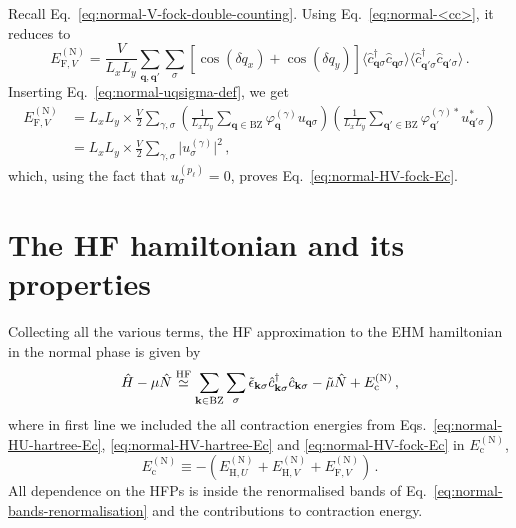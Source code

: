 \begin{tabproof}

	Recall Eq.~\eqref{eq:normal-V-fock-double-counting}. Using Eq.~\eqref{eq:normal-<cc>}, it reduces to
	\[
		E_{\mathrm{F},V}^{(\mathrm{N})} = \frac{V}{L_x L_y} \sum_{ \mathbf{q}, \mathbf{q}'} \sum_\sigma \left[
		\cos \left(
		\delta q_x
		\right)	+ \cos \left(
		\delta q_y
		\right)	
		\right]	
		\langle
		\hat c_{\mathbf{q} \sigma}^\dagger \hat c_{\mathbf{q} \sigma}
		\rangle \langle
		\hat c_{\mathbf{q}' \sigma}^\dagger  \hat c_{\mathbf{q}' \sigma}
		\rangle \, .
	\]
	Inserting Eq.~\eqref{eq:normal-uqsigma-def}, we get
	\[
	\begin{aligned}
		E_{\mathrm{F},V}^{(\mathrm{N})} &= L_x L_y \times \frac{V}{2} \sum_{\gamma,\sigma} \left(
		\frac{1}{L_x L_y} \sum_{\mathbf{q}\in\mathrm{BZ}} \varphi_\mathbf{q}^{(\gamma)} u_{\mathbf{q}\sigma}
		\right) \left(
		\frac{1}{L_x L_y} \sum_{\mathbf{q}'\in\mathrm{BZ}} \varphi_{\mathbf{q}'}^{(\gamma)*} u_{\mathbf{q}'\sigma}^*
		\right) \\
		&= L_x L_y \times \frac{V}{2} \sum_{\gamma,\sigma}
		\big|
			u_\sigma^{(\gamma)}
		\big|^2 \, ,
	\end{aligned}
	\]
	which, using the fact that $u_\sigma^{(p_\ell)}=0$, proves Eq.~\eqref{eq:normal-HV-fock-Ec}.
\end{tabproof}

\section{The HF hamiltonian and its properties}\label{sec:normal-hf-hamiltonian}

Collecting all the various terms, the HF approximation to the EHM hamiltonian in the normal phase is given by
\begin{equation}\label{eq:normal-Hhf}
	\hat H - \mu \hat N \stackrel{\mathrm{HF}}{\simeq} \sum_{\mathbf{k} \in \mathrm{BZ}} \sum_\sigma \tilde{\epsilon}_{\mathbf{k}\sigma}
	\hat c_{\mathbf{k}\sigma}^\dagger \hat c_{\mathbf{k}\sigma} - \tilde{\mu} \hat N + E_\mathrm{c}^{(\mathrm{N})} \, ,
\end{equation}
where in first line we included the all contraction energies from Eqs.~\eqref{eq:normal-HU-hartree-Ec}, \eqref{eq:normal-HV-hartree-Ec} and \eqref{eq:normal-HV-fock-Ec} in $E_\mathrm{c}^{(\mathrm{N})}$,
\begin{equation}\label{eq:normal-Ec}
	E_\mathrm{c}^{(\mathrm{N})} \equiv
	-\left(
	E_{\mathrm{H},U}^{(\mathrm{N})} + E_{\mathrm{H},V}^{(\mathrm{N})} +  E_{\mathrm{F},V}^{(\mathrm{N})}
	\right) \, .
\end{equation}
All dependence on the HFPs is inside the renormalised bands of Eq.~\eqref{eq:normal-bands-renormalisation} and the contributions to contraction energy.

